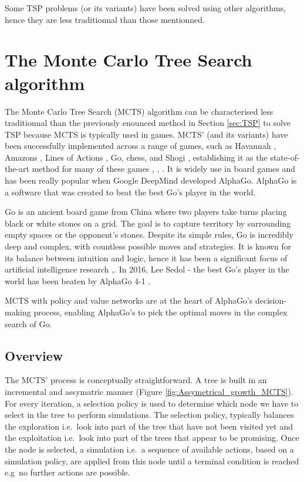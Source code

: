 Some TSP problems (or its variants) have been solved using other algorithms, hence they are less traditionnal than those mentionned.

\newpage
\section{The Monte Carlo Tree Search algorithm}

The Monte Carlo Tree Search (MCTS) algorithm can be characterised less traditionnal than the previously enounced method in Section \ref{sec:TSP} to solve TSP because MCTS is typically used in games. MCTS' (and its variants)
have been successfully implemented across a range of games, such as Havannah \cite{wiki:board_game},  Amazons \cite{wiki:Game_of_the_Amazons}, Lines of Actions \cite{wiki:Lines_of_Action}, Go, chess, and Shogi \cite{wiki:Shogi}, establishing it as the state-of-the-art method for many of these games \cite{havannah}, \cite{amazons}, \cite{lines_of_actions}. It is widely use in board games and has been really popular when Google DeepMind developed AlphaGo. AlphaGo is a software that was created to beat the best Go's player in the world.

Go is an ancient board game from China where two players take turns placing black or white stones on a grid. The goal is to capture territory by surrounding empty spaces or the opponent’s stones. Despite its simple rules, Go is incredibly deep and complex, with countless possible moves and strategies. It is known for its balance between intuition and logic, hence it has been a significant focus of artificial intelligence research ,\cite{wiki:Go}. In 2016, Lee Sedol \cite{wiki:Lee_Sedol} - the best Go's player in the world has been beaten by AlphaGo 4-1 \cite{alpha_go_documentary}.

MCTS with policy and value networks are at the heart of AlphaGo's decision-making process, enabling AlphaGo's to pick the optimal moves in the complex search of Go. \cite{mcts_alpha_go_algorithm}



\subsection{Overview}
The MCTS' process is conceptually straightforward. A tree is built in an incremental and assymatric manner (Figure \ref{fig:Assymetrical_growth_MCTS}).
For every iteration, a selection policy is used to determine which node we have to select in the tree to perform simulations.
The selection policy, typically balances the exploration  i.e.\ look into part of the tree that have not been visited yet and the exploitation i.e.\ look into part of the trees that appear to be promising.
Once the node is selected, a simulation i.e.\ a sequence of available actions, based on a simulation policy, are applied from this node until a terminal condition is reached e.g\ no further actions are possible. \cite{mcts_various_policies}

